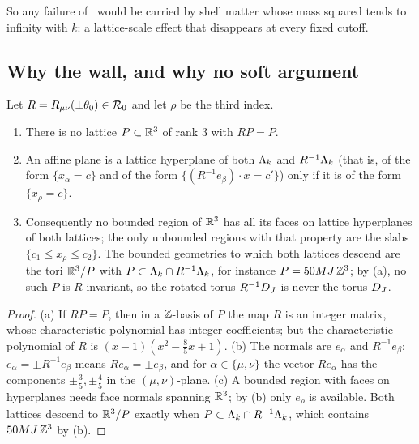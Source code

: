 So any failure of \REa\ would be carried by shell matter whose mass squared tends to infinity with $k$: a lattice-scale effect that disappears at every fixed cutoff.

\subsection{Why the wall, and why no soft argument}

\begin{proposition}\label{rot:prop:forced}
Let $R=R_{\mu\nu}(\pm\theta_0)\in\mathcal R_0$ and let $\rho$ be the third index.
\begin{enumerate}[label=\textup{(\alph*)},leftmargin=*]
\item There is no lattice $P\subset\mathbb R^3$ of rank $3$ with $RP=P$.
\item An affine plane is a lattice hyperplane of both $\Lambda_k$ and $R^{-1}\Lambda_k$ (that is, of the form $\{x_\alpha=c\}$ and of the form $\{(R^{-1}e_\beta)\cdot x=c'\}$) only if it is of the form $\{x_\rho=c\}$.
\item Consequently no bounded region of $\mathbb R^3$ has all its faces on lattice hyperplanes of both lattices; the only unbounded regions with that property are the slabs $\{c_1\le x_\rho\le c_2\}$. The bounded geometries to which both lattices descend are the tori $\mathbb R^3/P$ with $P\subset\Lambda_k\cap R^{-1}\Lambda_k$, for instance $P=50MJ\,\mathbb Z^3$; by \textup{(a)}, no such $P$ is $R$-invariant, so the rotated torus $R^{-1}D_J$ is never the torus $D_J$.
\end{enumerate}
\end{proposition}

\begin{proof}
(a) If $RP=P$, then in a $\mathbb Z$-basis of $P$ the map $R$ is an integer matrix, whose characteristic polynomial has integer coefficients; but the characteristic polynomial of $R$ is $(x-1)(x^2-\frac85x+1)$. (b) The normals are $e_\alpha$ and $R^{-1}e_\beta$; $e_\alpha=\pm R^{-1}e_\beta$ means $Re_\alpha=\pm e_\beta$, and for $\alpha\in\{\mu,\nu\}$ the vector $Re_\alpha$ has the components $\pm\frac35,\pm\frac45$ in the $(\mu,\nu)$-plane. (c) A bounded region with faces on hyperplanes needs face normals spanning $\mathbb R^3$; by (b) only $e_\rho$ is available. Both lattices descend to $\mathbb R^3/P$ exactly when $P\subset\Lambda_k\cap R^{-1}\Lambda_k$, which contains $50MJ\,\mathbb Z^3$ by (b).
\end{proof}

